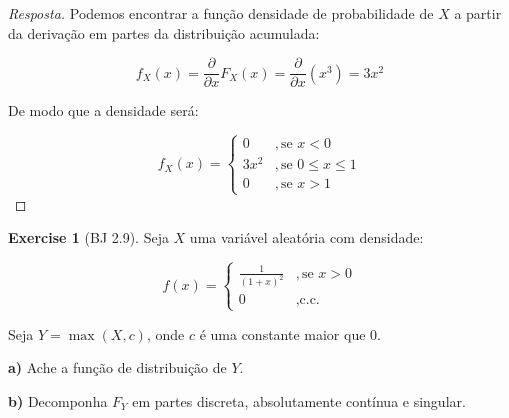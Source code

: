 \documentclass[
]{article}
\theoremstyle{definition}
\theoremstyle{definition}
\theoremstyle{definition}
\newtheorem{exercise}{Exercise}[section]
\theoremstyle{definition}
\theoremstyle{remark}
\begin{document}
\begin{proof}[Resposta]
Podemos encontrar a função densidade de probabilidade de \(X\) a partir da derivação em partes da distribuição acumulada:

\begin{equation*}
f_{X}(x) = \frac{\partial}{\partial x}F_{X}(x) = \frac{\partial}{\partial x}(x^{3}) = 3x^{2}
\end{equation*}

De modo que a densidade será:

\begin{equation*}
f_{X}(x) = \begin{cases}
0 & ,\text{se }x<0 \\
3x^{2} & ,\text{se }0 \le x \le 1 \\
0 & ,\text{se }x>1
\end{cases}
\end{equation*}
\end{proof}

\begin{exercise}[BJ 2.9]
Seja \(X\) uma variável aleatória com densidade:

\begin{equation*}
f(x) = \begin{cases}
\frac{1}{(1+x)^{2}} &, \text{se } x > 0 \\
0 & ,\text{c.c.}
\end{cases}
\end{equation*}

Seja \(Y = \max(X,c)\), onde \(c\) é uma constante maior que 0.

\textbf{a)} Ache a função de distribuição de \(Y\).

\textbf{b)} Decomponha \(F_{Y}\) em partes discreta, absolutamente contínua e singular.
\end{exercise}
\end{document}
